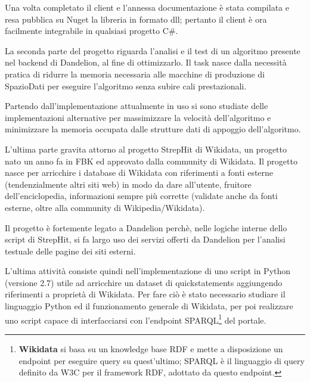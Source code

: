 Una volta completato il client e l'annessa documentazione è stata compilata e resa pubblica su Nuget\cite{nuget} la libreria in formato dll; 
pertanto il client è ora facilmente integrabile in qualsiasi progetto C$\#$.

La seconda parte del progetto riguarda l'analisi e il test di un algoritmo presente nel backend di Dandelion, al fine di ottimizzarlo. 
Il task nasce dalla necessità pratica di ridurre la memoria necessaria alle macchine di produzione di SpazioDati per eseguire l'algoritmo senza subire cali prestazionali.

Partendo dall'implementazione attualmente in uso si sono studiate delle implementazioni alternative per massimizzare la velocità dell'algoritmo e minimizzare 
la memoria occupata dalle strutture dati di appoggio dell'algoritmo. 

L'ultima parte gravita attorno al progetto StrepHit di Wikidata, un progetto nato un anno fa in FBK\cite{fbk} ed approvato dalla community di Wikidata. 
Il progetto nasce per arricchire i database di Wikidata con riferimenti a fonti esterne (tendenzialmente altri siti web) in modo da dare all'utente, fruitore dell'enciclopedia, 
informazioni sempre più corrette (validate anche da fonti esterne, oltre alla community di Wikipedia/Wikidata).

Il progetto è fortemente legato a Dandelion perchè, nelle logiche interne dello script di StrepHit, si fa largo uso dei servizi offerti da Dandelion per l'analisi testuale 
delle pagine dei siti esterni.

L'ultima attività consiste quindi nell'implementazione di uno script in Python (versione 2.7) utile ad arricchire un dataset di quickstatements\cite{quickstatements} aggiungendo riferimenti a proprietà di Wikidata.
Per fare ciò è stato necessario studiare il linguaggio Python ed il funzionamento generale di Wikidata, per poi realizzare uno script capace di interfacciarsi con l'endpoint SPARQL\footnote{
    \textbf{Wikidata}\cite{wikidata} si basa su un knowledge base RDF\cite{rdf} e mette a disposizione un endpoint per eseguire query su quest'ultimo; 
    SPARQL\cite{sparql-query} è il linguaggio di query definito da W3C\cite{w3c} per il framework RDF, adottato da questo endpoint.
} del portale.
